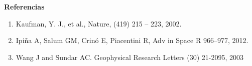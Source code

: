 \documentclass{article}
\begin{document}
\hspace{1cm}\vspace{0.5cm}
\begin{minipage}{0.35\linewidth}
\begin{center}
\begin{shaded}
\textbf{\textcolor{ver}{Referencias}}
\end{shaded}
\end{center}
\changefontsizes{9pt}
\begin{enumerate}
    \item Kaufman, Y. J., et al., Nature, (419) 215 – 223, 2002.
    \item Ipiña A, Salum GM, Crinó E, Piacentini R, Adv in Space R 966–977, 2012.
    \item Wang J and Sundar AC. Geophysical Research Letters (30) 21-2095, 2003
\end{enumerate}
\end{minipage}
\end{document}
